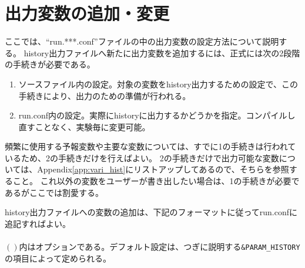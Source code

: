 

\section{出力変数の追加・変更}
\label{sec:output}
ここでは、``run.***.conf''ファイルの中の出力変数の設定方法について説明する。
history出力ファイルへ新たに出力変数を追加するには、正式には次の2段階の手続きが必要である。

\begin{enumerate}
\item ソースファイル内の設定。対象の変数をhistory出力するための設定で、この手続きにより、出力のための準備が行われる。
\item run.conf内の設定。実際にhistoryに出力するかどうかを指定。コンパイルし直すことなく、実験毎に変更可能。
\end{enumerate}
頻繁に使用する予報変数や主要な変数については、すでに1の手続きは行われているため、2の手続きだけを行えばよい。
2の手続きだけで出力可能な変数については、Appendix\ref{app:vari_hist}にリストアップしてあるので、そちらを参照すること。
これ以外の変数をユーザーが書き出したい場合は、1の手続きが必要であるがここでは割愛する。


history出力ファイルへの変数の追加は、下記のフォーマットに従ってrun.confに追記すればよい。\\

{\small {\gt
{}}}\\

$\left( \right)$内はオプションである。デフォルト設定は、つぎに説明する\verb|&PARAM_HISTORY|の項目によって定められる。\\

